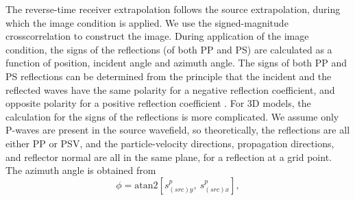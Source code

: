 \documentclass[manuscript,ulem,graphix,revised]{geophysics}
\begin{document}


The reverse-time receiver extrapolation follows the source extrapolation, during which the image condition is applied. We use the signed-magnitude crosscorrelation to construct the image. 
During application of the image condition, the signs of the reflections (of both PP and PS) are calculated as a function of position, incident angle and azimuth angle.
The signs of both PP and PS reflections can be determined from the principle that the incident and the reflected waves have the same polarity for a negative reflection coefficient, and opposite polarity for a positive reflection coefficient \citep{aki80}. For 3D models, the calculation for the signs of the reflections is more complicated. 
We assume only P-waves are present in the source wavefield, so theoretically, the reflections are all either PP or PSV, and the particle-velocity directions, propagation directions, and reflector normal are all in the same plane, for a reflection at a grid point. The azimuth angle is obtained from 
\marginpar{[5]}
\begin{equation}
\phi=\mathrm{atan2}[s^{p}_{(src)y},\ s^{p}_{(src)x}],
\label{eqn:azm_agl}
\end{equation}
\end{document}

